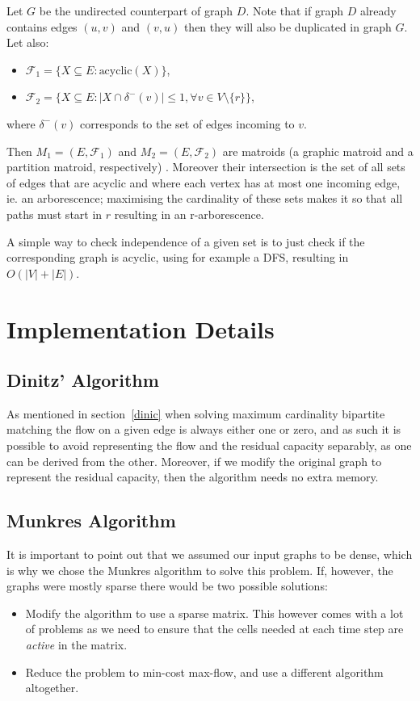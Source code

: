 \documentclass[a4,11pt]{article}
\begin{document}
Let $G$ be the undirected counterpart of graph $D$. Note that if graph $D$ already contains edges $(u, v)$ and $(v, u)$ then they will also be duplicated in graph $G$. Let also:

\begin{itemize}
    \setlength\itemsep{-.1em}
    \item $\mathcal{F}_1 = \{X \subseteq E: \text{acyclic}(X)\}$,
    \item $\mathcal{F}_2 = \{X \subseteq E: |X \cap \delta^-(v)| \le 1, \forall v \in V \setminus \{r\} \}$,
\end{itemize}

where $\delta^-(v)$ corresponds to the set of edges incoming to $v$.

Then $M_1 = (E, \mathcal{F}_1)$ and $M_2 = (E, \mathcal{F}_2)$ are matroids (a graphic matroid and a partition matroid, respectively) \cite{goemans_handout_2011}. Moreover their intersection is the set of all sets of edges that are acyclic and where each vertex has at most one incoming edge, ie. an arborescence; maximising the cardinality of these sets makes it so that all paths must start in $r$ resulting in an r-arborescence.

A simple way to check independence of a given set is to just check if the corresponding graph is acyclic, using for example a DFS, resulting in $O(\left|V\right| + \left|E\right|)$.

\section{Implementation Details}
\subsection{Dinitz' Algorithm}
As mentioned in section~\ref{dinic} when solving maximum cardinality bipartite matching the flow on a given edge is always either one or zero, and as such it is possible to avoid representing the flow and the residual capacity separably, as one can be derived from the other. Moreover, if we modify the original graph to represent the residual capacity, then the algorithm needs no extra memory.

\subsection{Munkres Algorithm}
It is important to point out that we assumed our input graphs to be dense, which is why we chose the Munkres algorithm to solve this problem. If, however, the graphs were mostly sparse there would be two possible solutions:
\begin{itemize}
    \setlength\itemsep{-.1em}
    \item Modify the algorithm to use a sparse matrix. This however comes with a lot of problems as we need to ensure that the cells needed at each time step are \textit{active} in the matrix.
    \item Reduce the problem to min-cost max-flow, and use a different algorithm altogether.
\end{itemize}
\end{document}
